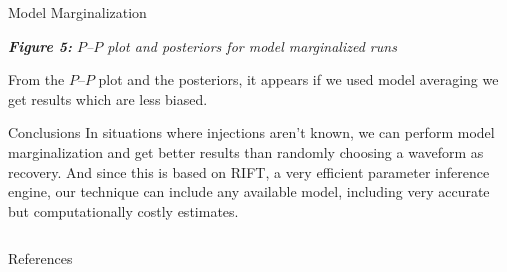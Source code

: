 \documentclass[serif]{beamer}
\begin{document}
\begin{frame}{}
\begin{columns}
\begin{column}[T]{0.3\textwidth}
\begin{block}{Model Marginalization}
\begin{center}
\small{\emph{\textbf{Figure 5:} $P$--$P$ plot and posteriors for model marginalized runs}}
\vspace{0.1em}
\end{center}
\small{From the $P$--$P$ plot and the posteriors, it appears if we used model averaging we get results which are less biased.}


\vspace{-0.20em}




\end{block}

\vspace{0.5em}
\begin{block}{Conclusions}
In situations where injections aren't known, we can perform model marginalization and get better results than randomly choosing a waveform as recovery. And since this is based on RIFT, a very efficient parameter inference engine, our technique can include any available model, including very accurate but computationally costly estimates.
 



\end{block}

\end{column}

\end{columns}

\vspace{0.5em}

\begin{block}{References}
\vspace{-1em}
\begin{multicols}{2}
  {\tiny{
  
%    
      }}

\end{multicols}

%   
%   
\end{block}
\end{frame}
\end{document}
